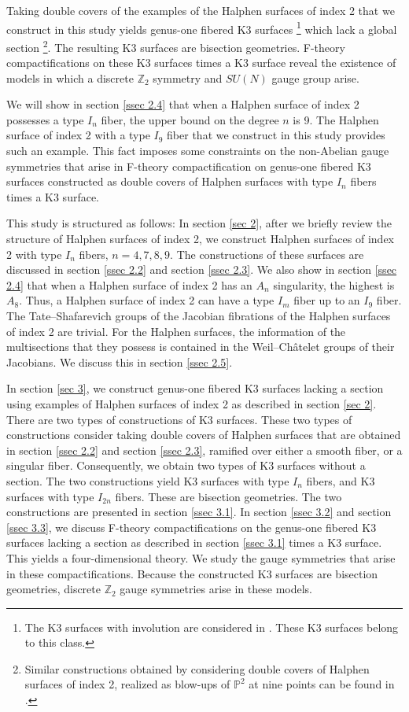 \documentclass[12pt]{article}
\def\Z{\mathbb{Z}}
\def\P{\mathbb{P}}
\begin{document}
\par Taking double covers of the examples of the Halphen surfaces of index 2 that we construct in this study yields genus-one fibered K3 surfaces \footnote{The K3 surfaces with involution are considered in \cite{Nikfactor}. These K3 surfaces belong to this class.} which lack a global section \footnote{Similar constructions obtained by considering double covers of Halphen surfaces of index 2, realized as blow-ups of $\P^2$ at nine points can be found in \cite{Kimura1801}.}. The resulting K3 surfaces are bisection geometries. F-theory compactifications on these K3 surfaces times a K3 surface reveal the existence of models in which a discrete $\Z_2$ symmetry and $SU(N)$ gauge group arise.
\par We will show in section \ref{ssec 2.4} that when a Halphen surface of index 2 possesses a type $I_n$ fiber, the upper bound on the degree $n$ is 9. The Halphen surface of index 2 with a type $I_9$ fiber that we construct in this study provides such an example. This fact imposes some constraints on the non-Abelian gauge symmetries that arise in F-theory compactification on genus-one fibered K3 surfaces constructed as double covers of Halphen surfaces with type $I_n$ fibers times a K3 surface. 
\par This study is structured as follows: In section \ref{sec 2}, after we briefly review the structure of Halphen surfaces of index 2, we construct Halphen surfaces of index 2 with type $I_n$ fibers, $n=4,7,8,9$. The constructions of these surfaces are discussed in section \ref{ssec 2.2} and section \ref{ssec 2.3}. We also show in section \ref{ssec 2.4} that when a Halphen surface of index 2 has an $A_n$ singularity, the highest is $A_8$. Thus, a Halphen surface of index 2 can have a type $I_m$ fiber up to an $I_9$ fiber. The Tate--Shafarevich groups of the Jacobian fibrations of the Halphen surfaces of index 2 are trivial. For the Halphen surfaces, the information of the multisections that they possess is contained in the Weil--Ch\^{a}telet groups of their Jacobians. We discuss this in section \ref{ssec 2.5}.
\par In section \ref{sec 3}, we construct genus-one fibered K3 surfaces lacking a section using examples of Halphen surfaces of index 2 as described in section \ref{sec 2}. There are two types of constructions of K3 surfaces. These two types of constructions consider taking double covers of Halphen surfaces that are obtained in section \ref{ssec 2.2} and section \ref{ssec 2.3}, ramified over either a smooth fiber, or a singular fiber. Consequently, we obtain two types of K3 surfaces without a section. The two constructions yield K3 surfaces with type $I_n$ fibers, and K3 surfaces with type $I_{2n}$ fibers. These are bisection geometries. The two constructions are presented in section \ref{ssec 3.1}. In section \ref{ssec 3.2} and section \ref{ssec 3.3}, we discuss F-theory compactifications on the genus-one fibered K3 surfaces lacking a section as described in section \ref{ssec 3.1} times a K3 surface. This yields a four-dimensional theory. We study the gauge symmetries that arise in these compactifications. Because the constructed K3 surfaces are bisection geometries, discrete $\Z_2$ gauge symmetries arise in these models. 
\end{document}
